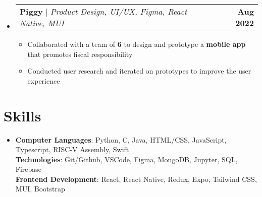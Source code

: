 \documentclass[letterpaper,11pt]{article}
\makeatletter
\newcommand{\resumeItem}[1]{
  
  \item\small{
    {#1 \vspace{3pt}}
  }
}
\newcommand{\resumeProjectHeading}[2]{
  \item
    \begin{tabular*}{1.001\textwidth}{l@{\extracolsep{\fill}}r}
      \normalsize#1 & \textbf{\small #2}\\
    \end{tabular*}\vspace{-5pt}
}
\newcommand{\resumeSubHeadingListStart}{\begin{itemize}[leftmargin=0.0in, label={}]}
\newcommand{\resumeSubHeadingListEnd}{\end{itemize}}
\newcommand{\resumeItemListStart}{\begin{itemize}}
\newcommand{\resumeItemListEnd}{\end{itemize}\vspace{-2pt}}
\makeatother
\begin{document}
    \resumeSubHeadingListStart
    \resumeProjectHeading
      {\textbf{Piggy} | \small\textit{Product Design, UI/UX, Figma, React Native, MUI}}{Aug 2022}
      \resumeItemListStart
      \resumeItem{Collaborated with a team of \textbf{6} to design and prototype a \textbf{mobile app} that promotes fiscal responsibility}
      \resumeItem{Conducted user research and iterated on prototypes to improve the user experience}
      \resumeItemListEnd
      
   
      \resumeSubHeadingListEnd
    

\vspace{-16pt}


\section{Skills}
 \begin{itemize}[leftmargin=0.15in, label={}]
    \item{
      \textbf{Computer Languages}{: Python, C, Java, HTML/CSS, JavaScript, Typescript, RISC-V Assembly, Swift} \\
      \vspace{4pt}
      \textbf{Technologies}{: Git/Github, VSCode, Figma, MongoDB, Jupyter, SQL, Firebase} \\
      \vspace{4pt}
      \textbf{Frontend Development}{: React, React Native, Redux, Expo, Tailwind CSS, MUI, Bootstrap} \\
    }

 \end{itemize}
 \vspace{-10pt}
 
                
\end{document}
